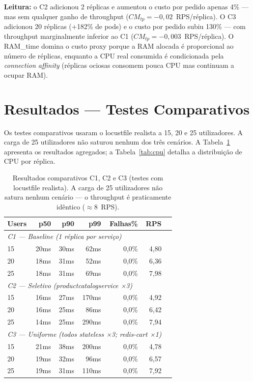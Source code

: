 \documentclass[acmsmall,screen=true,nonacm]{acmart}
\begin{document}
\textbf{Leitura:} o C2 adicionou 2 réplicas e aumentou o custo por pedido apenas 4\% — mas sem qualquer ganho de throughput ($CM_{tp}=-0{,}02$~RPS/réplica). O C3 adicionou 20 réplicas (+182\% de pods) e o custo por pedido subiu 130\% — com throughput marginalmente inferior ao C1 ($CM_{tp}=-0{,}003$~RPS/réplica). O RAM\_time domina o custo proxy porque a RAM alocada é proporcional ao número de réplicas, enquanto a CPU real consumida é condicionada pela \textit{connection affinity} (réplicas ociosas consomem pouca CPU mas continuam a ocupar RAM).

\section{Resultados — Testes Comparativos}
\label{sec:comparativos}

Os testes comparativos usaram o locustfile realista a 15, 20 e 25 utilizadores. A carga de 25 utilizadores não saturou nenhum dos três cenários. A Tabela~\ref{tab:comparativos} apresenta os resultados agregados; a Tabela~\ref{tab:cpu} detalha a distribuição de CPU por réplica.

\begin{table}[h]
\caption{Resultados comparativos C1, C2 e C3 (testes com locustfile realista). A carga de 25 utilizadores não satura nenhum cenário — o throughput é praticamente idêntico ($\approx$8~RPS).}
\label{tab:comparativos}
\begin{tabular}{lrrrrrr}
\toprule
\textbf{Users} & \textbf{p50} & \textbf{p90} & \textbf{p99} & \textbf{Falhas\%} & \textbf{RPS} \\
\midrule
\multicolumn{6}{l}{\textit{C1 — Baseline (1 réplica por serviço)}} \\
15 & 20ms & 30ms & 62ms & 0,0\% & 4,80 \\
20 & 18ms & 31ms & 52ms & 0,0\% & 6,36 \\
25 & 18ms & 31ms & 69ms & 0,0\% & 7,98 \\
\midrule
\multicolumn{6}{l}{\textit{C2 — Seletivo (productcatalogservice ×3)}} \\
15 & 16ms & 27ms & 170ms & 0,0\% & 4,92 \\
20 & 16ms & 25ms & 86ms & 0,0\% & 6,42 \\
25 & 14ms & 25ms & 290ms & 0,0\% & 7,94 \\
\midrule
\multicolumn{6}{l}{\textit{C3 — Uniforme (todos stateless ×3; redis-cart ×1)}} \\
15 & 21ms & 38ms & 200ms & 0,0\% & 4,78 \\
20 & 19ms & 32ms & 96ms & 0,0\% & 6,57 \\
25 & 19ms & 31ms & 110ms & 0,0\% & 7,92 \\
\bottomrule
\end{tabular}
\end{table}
\end{document}
